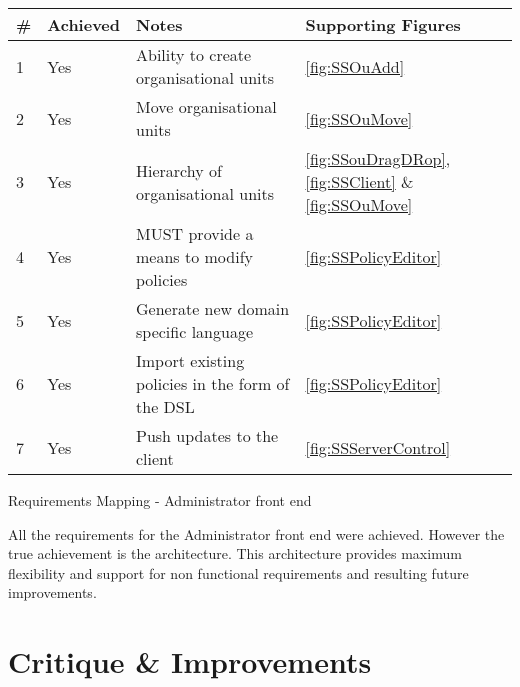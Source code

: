 	\begin{tablehere}
	
		\small{\begin{tabular}{ | p{5mm} | p{16mm} | p{100mm} | p{16mm} |}
		\hline
		\textbf{\#}							& \textbf{Achieved} 	& \textbf{Notes} 																			& \textbf{Supporting Figures}													\\ \hline		
		1	 	 	 						& Yes					& Ability to create organisational units													& \ref{fig:SSOuAdd}																\\ \hline
		2	 	 	 						& Yes					& Move organisational units																	& \ref{fig:SSOuMove}															\\ \hline
		3	 	 	 						& Yes					& Hierarchy of organisational units															& \ref{fig:SSouDragDRop}, \ref{fig:SSClient} \& \ref{fig:SSOuMove}				\\ \hline
		4	 	 	 						& Yes					& MUST provide a means to modify policies													& \ref{fig:SSPolicyEditor}														\\ \hline
		5	 	 	 						& Yes					& Generate new domain specific language														& \ref{fig:SSPolicyEditor}														\\ \hline
		6	 	 	 						& Yes					& Import existing policies in the form of the DSL											& \ref{fig:SSPolicyEditor}														\\ \hline
		7	 	 	 						& Yes					& Push updates to the client																& \ref{fig:SSServerControl}														\\ \hline

		\end{tabular}}
		
		\caption{Requirements Mapping - Administrator front end}
		\label{tab:RequirementsMappingAdministratorfrontend}	
		
	\end{tablehere}
	
	\vspace{5mm}
	\normalsize
	{
		All the requirements for the Administrator front end were achieved.  However the true achievement is the architecture.
		This architecture provides maximum flexibility and support for non functional requirements and resulting future improvements.
	}
					
	
	\section{Critique \& Improvements}
	
